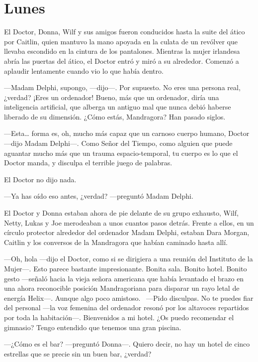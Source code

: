 \chapter*{Lunes}

El Doctor, Donna, Wilf y sus amigos fueron conducidos hasta la suite del
ático por Caitlin, quien mantuvo la mano apoyada en la culata de un
revólver que llevaba escondido en la cintura de los pantalones. Mientras
la mujer irlandesa abría las puertas del ático, el Doctor entró y miró a
su alrededor. Comenzó a aplaudir lentamente cuando vio lo que había
dentro.

---Madam Delphi, supongo, ---dijo---. Por supuesto. No eres una persona
real, ¿verdad? ¡Eres un ordenador! Bueno, más que un ordenador, diría
una inteligencia artificial, que alberga un antiguo mal que nunca debió
haberse liberado de su dimensión. ¿Cómo estás, Mandragora? Han pasado
siglos.

---Esta\ldots{} forma es, oh, mucho más capaz que un carnoso cuerpo
humano, Doctor ---dijo Madam Delphi---. Como Señor del Tiempo, como
alguien que puede aguantar mucho más que un trauma espacio-temporal, tu
cuerpo es lo que el Doctor manda, y disculpa el terrible juego de
palabras.

El Doctor no dijo nada.

---Ya has oído eso antes, ¿verdad? ---preguntó Madam Delphi.

El Doctor y Donna estaban ahora de pie delante de su grupo exhausto,
Wilf, Netty, Lukas y Joe merodeaban a unos cuantos pasos detrás. Frente
a ellos, en un círculo protector alrededor del ordenador Madam Delphi,
estaban Dara Morgan, Caitlin y los conversos de la Mandragora que habían
caminado hasta allí.

---Oh, hola ---dijo el Doctor, como si se dirigiera a una reunión del
Instituto de la Mujer---. Esto parece bastante impresionante. Bonita
sala. Bonito hotel. Bonito gesto ---señaló hacia la vieja señora
americana que había levantado el brazo en una ahora reconocible posición
Mandragoriana para disparar un rayo letal de energía Helix---. Aunque
algo poco amistoso. ~---Pido disculpas. No te puedes fiar del personal
---la voz femenina del ordenador resonó por los altavoces repartidos por
toda la habitación---. Bienvenidos a mi hotel. ¿Os puedo recomendar el
gimnasio? Tengo entendido que tenemos una gran piscina.

---¿Cómo es el bar? ---preguntó Donna---. Quiero decir, no hay un hotel
de cinco estrellas que se precie sin un buen bar, ¿verdad?

